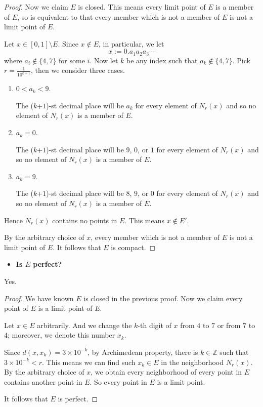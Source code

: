 \begin{Exercise}
\begin{proof}
		Now we claim $E$ is closed. This means every limit point of $E$ is a member of $E$, so is equivalent to that every member which is not a member of $E$ is not a limit point of $E$.
		
		Let $x\in[0,1]\setminus E$. Since $x\notin E$, in particular, we let
		$$
		x := 0.a_1 a_2 a_3 \cdots
		$$
		where $a_i\notin \{4,7\}$ for some $i$. Now let $k$ be any index such that $a_k\notin\{4,7\}$. Pick $r = \frac{1}{10^{k+1}}$, then we consider three cases.
		
		\begin{enumerate}
			\item $0 < a_k < 9$.
			
			The ($k$+$1$)-st decimal place will be $a_k$ for every element of $N_r(x)$ and so no element of $N_r(x)$ is a member of $E$.
			
			\item $a_k = 0$.
			
			The ($k$+$1$)-st decimal place will be $9$, $0$, or $1$ for every element of $N_r(x)$ and so no element of $N_r(x)$ is a member of $E$.
			
			\item $a_k = 9$.
			
			The ($k$+$1$)-st decimal place will be $8$, $9$, or $0$ for every element of $N_r(x)$ and so no element of $N_r(x)$ is a member of $E$.
		\end{enumerate}
		Hence $N_r(x)$ contains no points in $E$. This means $x\notin E'$.
		
		By the arbitrary choice of $x$, every member which is not a member of $E$ is not a limit point of $E$. It follows that $E$ is compact.
	\end{proof}
	
	\begin{itemize}
		\item \textbf{Is $E$ perfect?}
	\end{itemize}
	\begin{answer}
		Yes.
	\end{answer}
	\begin{proof}
		We have known $E$ is closed in the previous proof. Now we claim every point of $E$ is a limit point of $E$.
		
		Let $x\in E$ arbitrarily. And we change the $k$-th digit of $x$ from $4$ to $7$ or from $7$ to $4$; moreover, we denote this number $x_k$.
		
		Since $d(x, x_k)=3\times 10^{-k}$, by Archimedean property, there is $k\in\mathbb{Z}$ such that $3\times 10^{-k} < r$. This means we can find such $x_k\in E$ in the neighborhood $N_r(x)$. By the arbitrary choice of $x$, we obtain every neighborhood of every point in $E$ contains another point in $E$. So every point in $E$ is a limit point.
		
		It follows that $E$ is perfect.
	\end{proof}
\end{Exercise}
